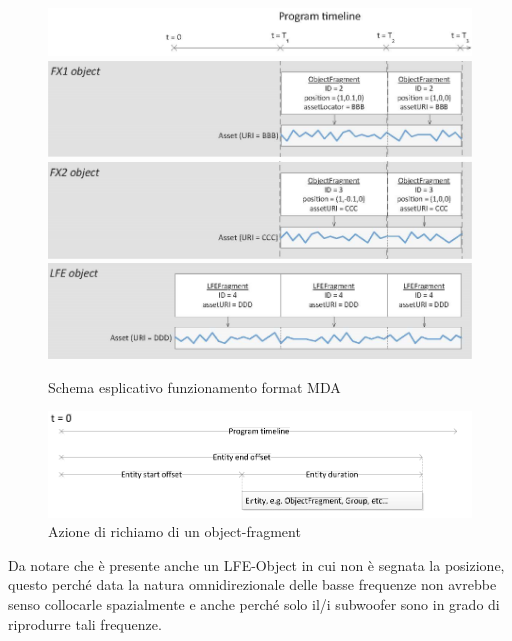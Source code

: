 \documentclass[12pt,a4paper]{report}
\begin{document}
\begin{figure}[htbp]
	\centering
	\includegraphics[scale=0.50]{figures/timeline.png}\\
	\includegraphics[scale=0.50]{figures/object1.png}\\
	\includegraphics[scale=0.50]{figures/object2.png}\\
	\includegraphics[scale=0.50]{figures/object3.png}
	\caption {Schema esplicativo funzionamento format MDA}
	\label{fig:object}
	\end{figure}

\begin{figure}[htbp]
	\centering
	\includegraphics[scale=0.50]{figures/timeline2.png}

	\caption {Azione di richiamo di un object-fragment}
	\label{fig:time}
	\end{figure}

Da notare che è presente anche un LFE-Object in cui non è segnata la posizione, questo perché data la natura omnidirezionale delle basse frequenze non avrebbe senso collocarle spazialmente e anche perché solo il/i subwoofer sono in grado di riprodurre tali frequenze.
\end{document}
